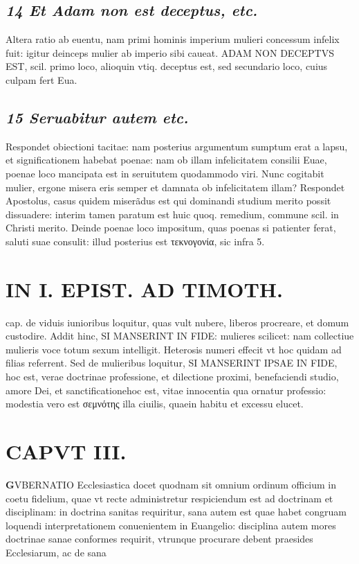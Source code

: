 \documentclass{article}
\begin{document}
\begin{pages}
\subsection*{\textit{14 Et Adam non est deceptus, etc. }}\pstart Altera ratio ab euentu, nam primi hominis imperium mulieri concessum infelix fuit: igitur deinceps mulier ab imperio sibi caueat. ADAM NON DECEPTVS EST, scil. primo loco, alioquin vtiq. deceptus est, sed secundario loco, cuius culpam fert Eua.  \pend
{}
{}
\subsection*{\textit{15 Seruabitur autem etc. }}\pstart Respondet obiectioni tacitae: nam posterius argumentum sumptum erat a lapsu, et significationem habebat poenae: nam ob illam infelicitatem consilii Euae, poenae loco mancipata est in seruitutem quodammodo viri. Nunc cogitabit mulier, ergone misera eris semper et damnata ob infelicitatem illam? Respondet Apostolus, casus quidem miserãdus est qui dominandi studium merito possit dissuadere: interim tamen paratum est huic quoq. remedium, commune scil. in Christi merito. Deinde poenae loco impositum, quas poenas si patienter ferat, saluti suae consulit: illud posterius est τεκνογονία, sic infra 5.  \pend
\section*{IN I. EPIST. AD TIMOTH. }
\marginpar{[ p.59 ]}\pstart cap. de viduis iunioribus loquitur, quas vult nubere, liberos procreare, et domum custodire. Addit hinc, SI MANSERINT IN FIDE: mulieres scilicet: nam collectiue mulieris voce totum sexum intelligit. Heterosis numeri effecit vt hoc quidam ad filias referrent. Sed de mulieribus loquitur, SI MANSERINT IPSAE IN FIDE, hoc est, verae doctrinae professione, et dilectione proximi, benefaciendi studio, amore Dei, et sanctificationehoc est, vitae innocentia qua ornatur professio: modestia vero est σεμνότης illa ciuilis, quaein habitu et excessu elucet.  \pend
\endnumbering\beginnumbering\section{CAPVT III.}\pstart \huge\textbf{G}\normalsize VBERNATIO Ecclesiastica docet quodnam sit omnium ordinum officium in coetu fidelium, quae vt recte administretur respiciendum est ad doctrinam et disciplinam: in doctrina sanitas requiritur, sana autem est quae habet congruam loquendi interpretationem conuenientem in Euangelio: disciplina autem mores doctrinae sanae conformes requirit, vtrunque procurare debent praesides Ecclesiarum, ac de sana  \pend

\end{pages}
\end{document}
